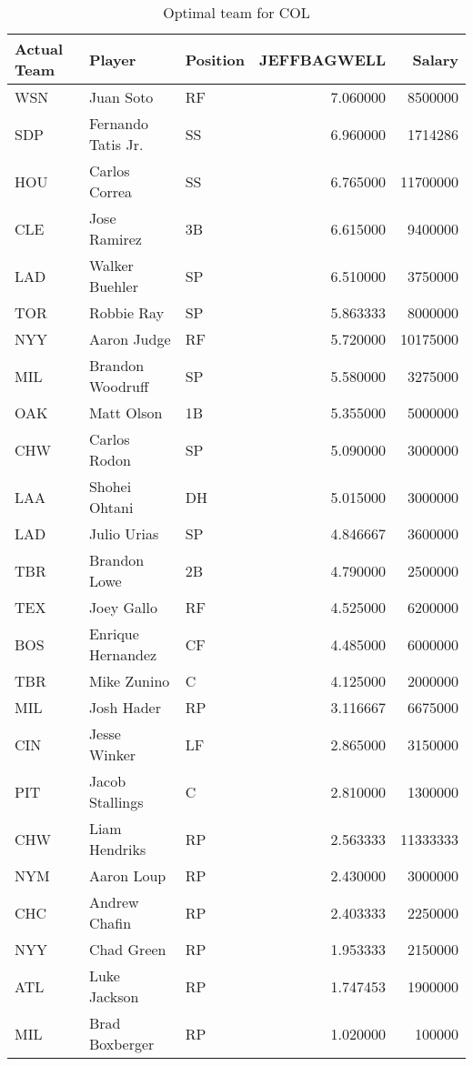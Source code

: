 \begin{table}

\caption{Optimal team for COL}
\centering
\begin{tabular}[t]{l|l|l|r|r}
\hline
Actual Team & Player & Position & JEFFBAGWELL & Salary\\
\hline
WSN & Juan Soto & RF & 7.060000 & 8500000\\
\hline
SDP & Fernando Tatis Jr. & SS & 6.960000 & 1714286\\
\hline
HOU & Carlos Correa & SS & 6.765000 & 11700000\\
\hline
CLE & Jose Ramirez & 3B & 6.615000 & 9400000\\
\hline
LAD & Walker Buehler & SP & 6.510000 & 3750000\\
\hline
TOR & Robbie Ray & SP & 5.863333 & 8000000\\
\hline
NYY & Aaron Judge & RF & 5.720000 & 10175000\\
\hline
MIL & Brandon Woodruff & SP & 5.580000 & 3275000\\
\hline
OAK & Matt Olson & 1B & 5.355000 & 5000000\\
\hline
CHW & Carlos Rodon & SP & 5.090000 & 3000000\\
\hline
LAA & Shohei Ohtani & DH & 5.015000 & 3000000\\
\hline
LAD & Julio Urias & SP & 4.846667 & 3600000\\
\hline
TBR & Brandon Lowe & 2B & 4.790000 & 2500000\\
\hline
TEX & Joey Gallo & RF & 4.525000 & 6200000\\
\hline
BOS & Enrique Hernandez & CF & 4.485000 & 6000000\\
\hline
TBR & Mike Zunino & C & 4.125000 & 2000000\\
\hline
MIL & Josh Hader & RP & 3.116667 & 6675000\\
\hline
CIN & Jesse Winker & LF & 2.865000 & 3150000\\
\hline
PIT & Jacob Stallings & C & 2.810000 & 1300000\\
\hline
CHW & Liam Hendriks & RP & 2.563333 & 11333333\\
\hline
NYM & Aaron Loup & RP & 2.430000 & 3000000\\
\hline
CHC & Andrew Chafin & RP & 2.403333 & 2250000\\
\hline
NYY & Chad Green & RP & 1.953333 & 2150000\\
\hline
ATL & Luke Jackson & RP & 1.747453 & 1900000\\
\hline
MIL & Brad Boxberger & RP & 1.020000 & 100000\\
\hline
\end{tabular}
\end{table}
